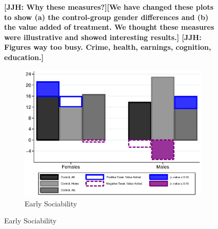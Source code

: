 \begin{figure}[!htbp]
\textbf{[JJH: Why these measures?][We have changed these plots to show (a) the control-group gender differences and (b) the value added of treatment. We thought these measures were illustrative and showed interesting results.] [JJH: Figures way too busy. Crime, health, earnings, cognition, education.]}
\centering
\caption{Differences Between ABC/CARE Males and Females}
\label{fig:value-added}
\begin{subfigure}[h]{0.495\textwidth}
	\centering
	\caption{Early Sociability}
	\label{fig:means-sociab}
	\includegraphics[width=\textwidth]{output/control-50a-sociabe}
\end{subfigure}


\end{figure}
